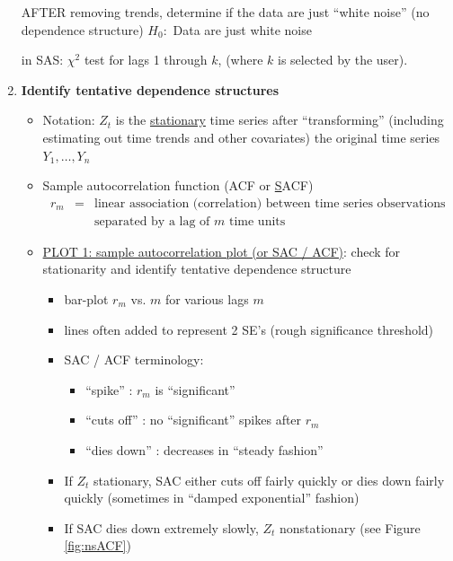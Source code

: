 \documentclass[12pt]{notes}
\begin{document}
\begin{enumerate}[leftmargin=*]
AFTER removing trends, determine if the data are just ``white noise'' (no dependence structure)
$H_0:$ Data are just white noise

in SAS: $\chi^2$ test for lags 1 through $k$, (where $k$ is selected by the user). 



\item \textbf{Identify tentative dependence structures}
\begin{itemize}

 \item Notation: $Z_t$ is the \underline{stationary} time series after ``transforming''
  (including estimating out time trends and other covariates)
  the original time series $Y_1,\ldots,Y_n$\\

 \item Sample autocorrelation function (ACF or \underline{S}ACF)
    \begin{eqnarray}
      r_m & = & \mbox{linear association (correlation) between time series observations} \nonumber \\
         &   & \mbox{separated by a lag of $m$ time units} \nonumber
   \end{eqnarray}


\item \underline{PLOT 1: sample autocorrelation plot (or SAC / ACF)}: check for stationarity and identify tentative dependence structure
\begin{itemize}
  \item bar-plot $r_m$ vs. $m$ for various lags $m$
  \item lines often added to represent 2 SE's (rough significance threshold)
  \item SAC / ACF terminology:
    \begin{itemize}
      \item ``spike'' : $r_m$ is ``significant''
      \item ``cuts off'' : no ``significant'' spikes after $r_m$
      \item ``dies down'' : decreases in ``steady fashion''
    \end{itemize}



\item If $Z_t$ stationary, SAC either cuts off fairly quickly or dies down fairly quickly (sometimes in ``damped exponential'' fashion) \\ \vspace{1em}
\item If SAC dies down extremely slowly, $Z_t$ nonstationary (see Figure \ref{fig:nsACF}) \\ \vspace{1em}


\end{itemize}
\end{itemize}
\end{enumerate}
\end{document}
